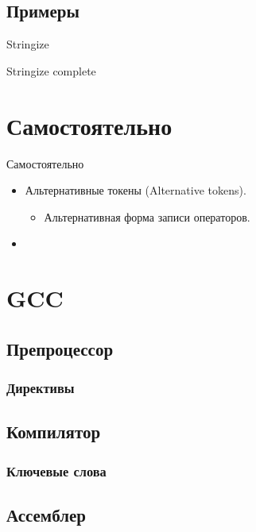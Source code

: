     \subsection{Примеры}
    \begin{frame}{Stringize}
        
    \end{frame}
    \begin{frame}{Stringize complete}
        
    \end{frame}

    \section{Самостоятельно}
    \begin{frame}{Самостоятельно}
        \begin{itemize}
            \item Альтернативные токены (Alternative tokens).
                \begin{itemize}
                    \item Альтернативная форма записи операторов.
                \end{itemize}
            \item
        \end{itemize}
    \end{frame}

    \section{GCC}
    \subsection{Препроцессор}
    \subsubsection{Директивы}
    \subsection{Компилятор}
    \subsubsection{Ключевые слова}
    \subsection{Ассемблер}
